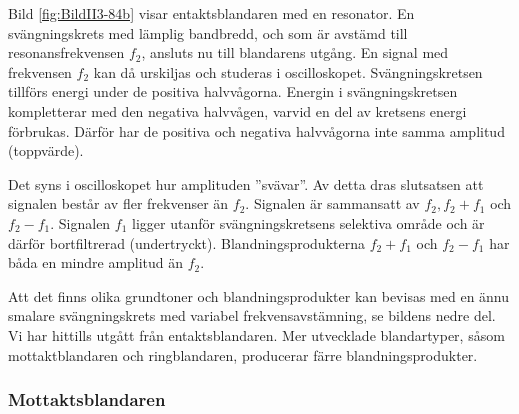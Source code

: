 Bild \ref{fig:BildII3-84b} visar entaktsblandaren med en resonator.
En svängningskrets med lämplig bandbredd, och som är avstämd till
resonansfrekvensen \(f_2\), ansluts nu till blandarens utgång.
En signal med frekvensen \(f_2\) kan då urskiljas och studeras i oscilloskopet.
Svängningskretsen tillförs energi under de positiva halvvågorna.
Energin i svängningskretsen kompletterar med den negativa halvvågen, varvid en
del av kretsens energi förbrukas.
Därför har de positiva och negativa halvvågorna inte samma amplitud (toppvärde).

Det syns i oscilloskopet hur amplituden ''svävar''.
Av detta dras slutsatsen att signalen består av fler frekvenser än \(f_2\).
Signalen är sammansatt av \(f_2, f_2+f_1\) och \(f_2-f_1\).
Signalen \(f_1\) ligger utanför svängningskretsens selektiva område och är
därför bortfiltrerad (undertryckt).
Blandningsprodukterna \(f_2 + f_1\) och \(f_2 - f_1\) har båda en mindre
amplitud än \(f_2\).

Att det finns olika grundtoner och blandningsprodukter kan bevisas med en ännu
smalare svängningskrets med variabel frekvensavstämning, se bildens nedre del.
Vi har hittills utgått från entaktsblandaren.
Mer utvecklade blandartyper, såsom mottaktblandaren och ringblandaren,
producerar färre blandningsprodukter.

\subsubsection{Mottaktsblandaren}

